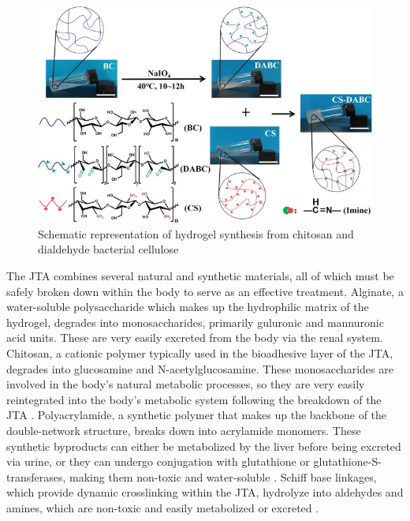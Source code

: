 \begin{figure}[b]
    \centering 
    \includegraphics[width=0.7\linewidth]{Figures/CS_DABC_condensation.jpg}
    \caption{Schematic representation of hydrogel synthesis from chitosan and dialdehyde bacterial cellulose \autocite{liAllnaturalInjectableHydrogel2020}}
    \label{fig:CS_DABC_condensation}
\end{figure}

The JTA combines several natural and synthetic materials, all of which must be safely broken down within the body to serve as an effective treatment. Alginate, a water-soluble polysaccharide which makes up the hydrophilic matrix of the hydrogel, degrades into monosaccharides, primarily guluronic and mannuronic acid units. These are very easily excreted from the body via the renal system. 
Chitosan, a cationic polymer typically used in the bioadhesive layer of the JTA, degrades into glucosamine and N-acetylglucosamine. These monosaccharides are involved in the body's natural metabolic processes, so they are very easily reintegrated into the body's metabolic system following the breakdown of the JTA \autocite{guarinoDegradationPropertiesMetabolic2015}.
Polyacrylamide, a synthetic polymer that makes up the backbone of the double-network structure, breaks down into acrylamide monomers. These synthetic byproducts can either be metabolized by the liver before being excreted via urine, or they can undergo conjugation with glutathione or glutathione-S-transferases, making them non-toxic and water-soluble \autocite{xiongPolyacrylamideDegradationIts2018}.
Schiff base linkages, which provide dynamic crosslinking within the JTA, hydrolyze into aldehydes and amines, which are non-toxic and easily metabolized or excreted \autocite{xuHydrogelsBasedSchiff2019}.

